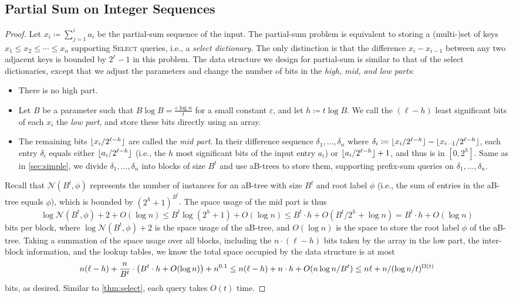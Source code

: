 \documentclass{article}
\theoremstyle{plain}
\theoremstyle{definition}  \newtheorem{definition}[theorem]{Definition}
\DeclarePairedDelimiter{\floor}{\lfloor}{\rfloor}
\DeclarePairedDelimiter{\bk}{(}{)}
\newcommand{\defeq}{\coloneqq}
\newcommand{\eps}{\varepsilon}
\renewcommand{\l}{\ell}
\newcommand{\select}{\textup{\textsc{Select}}\xspace}
\begin{document}
\subsection{Partial Sum on Integer Sequences}

\thmPartialSum*

\begin{proof}
    Let $x_i \defeq \sum_{j = 1}^i a_i$ be the partial-sum sequence of the input. The partial-sum problem is equivalent to storing a (multi-)set of keys $x_1 \le x_2 \le \cdots \le x_n$ supporting \select queries, i.e., a \emph{select dictionary}. The only distinction is that the difference $x_i - x_{i-1}$ between any two adjacent keys is bounded by $2^\l - 1$ in this problem. The data structure we design for partial-sum is similar to that of the select dictionaries, except that we adjust the parameters and change the number of bits in the \emph{high, mid, and low parts}:
    \begin{itemize}
    \item There is no high part.
    \item Let $B$ be a parameter such that $B \log B = \frac{\eps \log n}{t}$ for a small constant $\eps$, and let $h \defeq t \log B$. We call the $(\l - h)$ least significant bits of each $x_i$ the \emph{low part}, and store these bits directly using an array.
    \item The remaining bits $\floor{x_i / 2^{\l - h}}$ are called the \emph{mid part}. In their difference sequence $\delta_1, \ldots, \delta_n$ where $\delta_i \defeq \floor{x_i / 2^{\l - h}} - \floor{x_{i - 1} / 2^{\l - h}}$, each entry $\delta_i$ equals either $\floor{a_i / 2^{\l - h}}$ (i.e., the $h$ most significant bits of the input entry $a_i$) or $\floor{a_i / 2^{\l - h}} + 1$, and thus is in $[0, 2^h]$. Same as in \cref{sec:simple}, we divide $\delta_1, \ldots, \delta_n$ into blocks of size $B^t$ and use aB-trees to store them, supporting prefix-sum queries on $\delta_1, \ldots, \delta_n$.
    \end{itemize}

    Recall that $\mathcal{N}(B^t, \phi)$ represents the number of instances for an aB-tree with size $B^t$ and root label $\phi$ (i.e., the sum of entries in the aB-tree equals $\phi$), which is bounded by $(2^h + 1)^{B^t}$. The space usage of the mid part is thus
    \[
    \log \mathcal{N}(B^t, \phi) + 2 + O(\log n) \le B^t \log (2^h + 1) + O(\log n) \le B^t \cdot h + O(B^t / 2^h + \log n) = B^t \cdot h + O(\log n)
    \]
    bits per block, where $\log \mathcal{N}(B^t, \phi) + 2$ is the space usage of the aB-tree, and $O(\log n)$ is the space to store the root label $\phi$ of the aB-tree. Taking a summation of the space usage over all blocks, including the $n \cdot (\l - h)$ bits taken by the array in the low part, the inter-block information, and the lookup tables, we know the total space occupied by the data structure is at most
    \[
    n (\l - h) + \frac{n}{B^t} \cdot \bk*{
    B^t \cdot h + O(\log n)
    } + n^{0.1}
    \le n (\l - h) + n \cdot h + O(n \log n / B^t)
    \le n \l + n / (\log n / t)^{\Omega(t)}
    \]
    bits, as desired. Similar to \cref{thm:select}, each query takes $O(t)$ time.
\end{proof}
 
\end{document}
